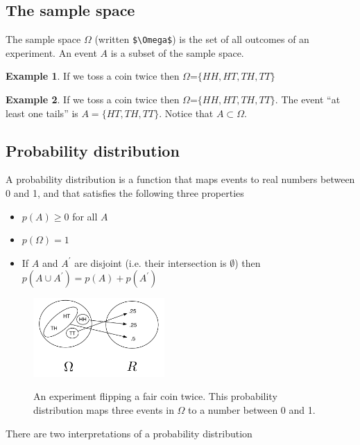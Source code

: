 \documentclass[]{article}
\theoremstyle{definition}
\newtheorem{exmp}{Example}[section]
\begin{document}
\subsection{The sample space}

The sample space $\Omega$  (written \verb|$\Omega$|) is the set of all outcomes of an experiment. An event $A$ is a subset of the sample space. 

\begin{exmp}
If we toss a coin twice then $\Omega$=$\{HH, HT, TH, TT\}$
\end{exmp}

\begin{exmp}
If we toss a coin twice then $\Omega$=$\{HH, HT, TH, TT\}.$ The event ``at least one tails'' is $A=\{HT, TH, TT\}$. Notice that $A \subset \Omega$.
\end{exmp}

\subsection{Probability distribution}

A probability distribution is a function that maps events to real numbers between 0 and 1, and that satisfies the following three properties

\begin{itemize}
\item $p(A) \geq 0$ for all $A$
\item $p(\Omega) = 1$
\item If $A$ and $A^\prime$ are disjoint (i.e. their intersection is $\emptyset$) then $p(A \cup A^{\prime}) =  p(A) + p(A^{\prime})$
\end{itemize}

\begin{figure}[h]
     \centering
    	{\includegraphics[width=5cm]{prob_distro}}
    \caption{An experiment flipping a fair coin twice. This probability distribution maps three events in $\Omega$ to a number between 0 and 1.}
     \label{steady_state}
\end{figure}

There are two interpretations of a probability distribution
\end{document}

